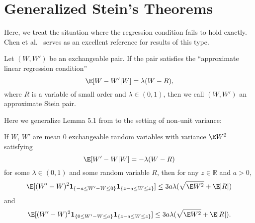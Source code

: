 
\section{Generalized Stein's Theorems}
Here, we treat the situation where the regression condition fails to hold exactly.
Chen et al.\ \cite{chen2010normal} serves as an excellent reference for results
of this type.

\begin{definition}
  Let $(W, W')$ be an exchangeable pair.  If the pair satisfies the ``approximate linear
  regression condition''
  \begin{equation}
    \label{D:approx-stein-pair}
    \E [W - W' | W] = \lambda (W - R),
  \end{equation}
  where $R$ is a variable of small order and $\lambda \in (0, 1)$, then we call $(W, W')$ an
  approximate Stein pair.
\end{definition}

Here we generalize Lemma 5.1 from \cite{chen2010normal} to the setting of non-unit variance:
\begin{theorem}
  \label{L:stein-difference-second-moment-generalization-bound}
  If $W$, $W'$ are mean 0 exchangeable random variables with variance $\E W^2$
  satisfying
  \begin{equation*}
    \E[W'-W|W] = -\lambda(W-R)
  \end{equation*}
  for some $\lambda \in (0,1)$ and some random variable $R$, then for any
  $z \in \mathbb{R}$ and $a > 0$,
  \begin{equation*}
    \E [(W'-W)^2 \mathbf{1}_{\{-a \leq W' - W \leq 0\}} \mathbf{1}_{\{z-a \leq W \leq z\}}] \leq
    3a \lambda (\sqrt{\E W^2} + \E |R|)
  \end{equation*}
  and
  \begin{equation*}
    \E [(W'-W)^2 \mathbf{1}_{\{0 \leq W' - W \leq a\}} \mathbf{1}_{\{z-a \leq W \leq z\}}] \leq
        3a \lambda (\sqrt{\E W^2} + \E |R|).
  \end{equation*}
\end{theorem}

